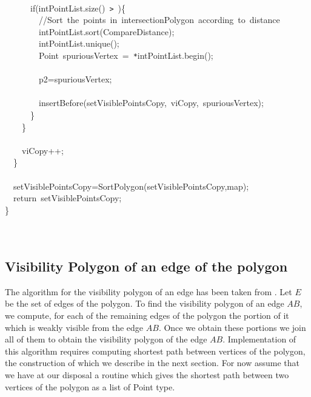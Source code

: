 \documentclass[a4paper,10pt]{article}
\begin{document}
{\jttstylea \\
\jttstylea ~~~~~~\jttstylee if\jttstylei (\jttstylek intPointList.size\jttstylei ()~\jttstylek \verb#>#~\jttstylei )\{\\
\jttstylea ~~~~~~~~\jttstyled //Sort~the~points~in~intersectionPolygon~according~to~distance\\
\jttstylea ~~~~~~~~\jttstylek intPointList.sort\jttstylei (\jttstylek CompareDistance\jttstylei )\jttstylek ;\\
\jttstylea ~~~~~~~~\jttstylek intPointList.unique\jttstylei ()\jttstylek ;\\
\jttstylea ~~~~~~~~\jttstylek Point~spuriousVertex~=~\verb#*#intPointList.begin\jttstylei ()\jttstylek ;\\
\jttstylea \\
\jttstylea ~~~~~~~~\jttstylek p2=spuriousVertex;\\
\jttstylea \\
\jttstylea ~~~~~~~~\jttstylek insertBefore\jttstylei (\jttstylek setVisiblePointsCopy,~viCopy,~spuriousVertex\jttstylei )\jttstylek ;\\
\jttstylea ~~~~~~\jttstylei \}\\
\jttstylea ~~~~\jttstylei \}\\
\jttstylea \\
\jttstylea ~~~~\jttstylek viCopy++;\\
\jttstylea ~~\jttstylei \}\\
\jttstylea \\
\jttstylea ~~\jttstylek setVisiblePointsCopy=SortPolygon\jttstylei (\jttstylek setVisiblePointsCopy,map\jttstylei )\jttstylek ;\\
\jttstylea ~~\jttstylee return~\jttstylek setVisiblePointsCopy;\\
\jttstylei \}\\
\jttstylea \\
\jttstylea \jttstylea 
\\

}


\subsection{Visibility Polygon of an edge of the polygon}
The algorithm for the visibility polygon of an edge has been taken from \cite{key3}.
Let $E$ be the set of edges of the polygon. To find the visibility polygon of an edge $AB$, we compute, for each of 
 the remaining edges of the polygon the portion of it which is weakly visible from the edge $AB$. Once we obtain these portions we join
 all of them to obtain the visibility polygon of the edge $AB$.
  Implementation of this algorithm requires computing shortest path between vertices of the polygon, the construction of which we 
describe in the next section. For now assume that we have at our disposal a routine which gives the shortest path between two vertices 
of the polygon as a list of Point type.
\end{document}
